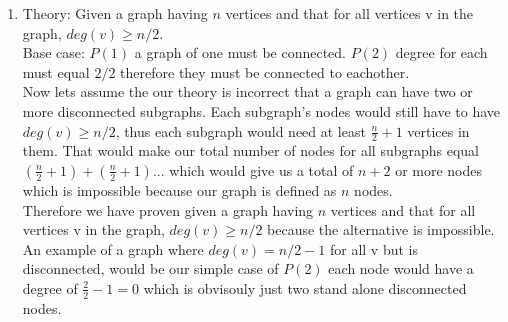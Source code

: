 \documentclass{article}
\begin{document}
\begin{enumerate}
\begin{enumerate}
      \item Theory: Given a graph having $n$ vertices and that for all vertices v in the graph, $deg(v) \geq n/2$.\\
      
      Base case: $P(1)$ a graph of one must be connected. $P(2)$ degree for each must equal $2/2$ therefore they must be connected to eachother.\\

      Now lets assume the our theory is incorrect that a graph can have two or more disconnected subgraphs. Each subgraph's nodes would still have to have $deg(v) \geq n/2$, thus each subgraph would need at least $\frac{n}{2} + 1$ vertices in them.
      That would make our total number of nodes for all subgraphs equal $(\frac{n}{2} + 1) + (\frac{n}{2} + 1) ...$ which would give us a total of $n + 2$ or more nodes which is impossible because our graph is defined as $n$ nodes.\\

      Therefore we have proven given a graph having $n$ vertices and that for all vertices v in the graph, $deg(v) \geq n/2$ because the alternative is impossible.\\

      An example of a graph where $deg(v) = n/2 -1$ for all v but is disconnected, would be our simple case of $P(2)$ each node would have a degree of $\frac{2}{2} - 1 = 0$ which is obvisouly just two stand alone disconnected nodes.
    \end{enumerate}
  \end{enumerate}  %
\end{document}
